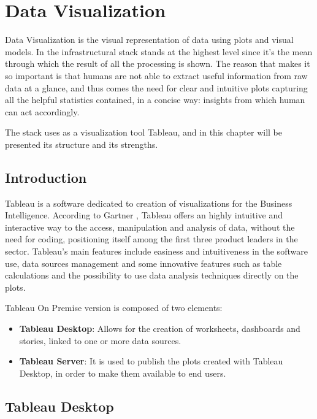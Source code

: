 \chapter{Data Visualization}

Data Visualization is the visual representation of data using plots and visual models. In the infrastructural stack stands at the highest level since it's the mean through which the result of all the processing is shown. The reason that makes it so important is that humans are not able to extract useful information from raw data at a glance, and thus comes the need for clear and intuitive plots capturing all the helpful statistics contained, in a concise way: insights from which human can act accordingly.

The stack uses as a visualization tool Tableau, and in this chapter will be presented its structure and its strengths. 

\section{Introduction}

Tableau is a software dedicated to creation of visualizations for the Business Intelligence. According to Gartner \cite{gartner_tableau}, Tableau offers an highly intuitive and interactive way to the access, manipulation and analysis of data, without the need for coding, positioning itself among the first three product leaders in the sector. Tableau's main features include easiness and intuitiveness in the software use, data sources management and some innovative features such as table calculations and the possibility to use data analysis techniques directly on the plots.

Tableau On Premise version is composed of two elements:

\begin{itemize}
    \item \textbf{Tableau Desktop}: Allows for the creation of worksheets, dashboards and stories, linked to one or more data sources.
    \item \textbf{Tableau Server}: It is used to publish the plots created with Tableau Desktop, in order to make them available to end users.
\end{itemize}

\section{Tableau Desktop}


